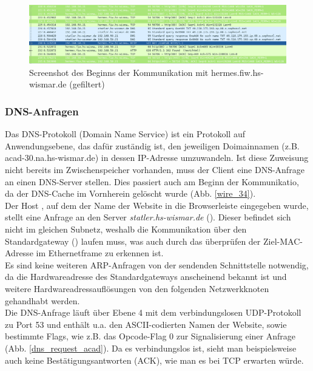 \documentclass[11pt, a4paper]{article}
\begin{document}
\begin{figure}[H]
  \centering
  \includegraphics[width=\textwidth]{graphics/versuch/3_4/wireshark/wire_34_hermes}
  \caption{Screenshot des Beginns der Kommunikation mit hermes.fiw.hs-wismar.de (gefiltert)}\label{wire_34_hermes}
\end{figure}

\subsubsection{DNS-Anfragen}
Das DNS-Protokoll (Domain Name Service) ist ein Protokoll auf Anwendungsebene, das dafür zuständig ist, den jeweiligen Doimainnamen (z.B. acad-30.na.hs-wismar.de) in dessen IP-Adresse umzuwandeln. Ist diese Zuweisung nicht bereits im Zwischenspeicher vorhanden, muss der Client eine DNS-Anfrage an einen DNS-Server stellen. Dies passiert auch am Beginn der Kommunikatio, da der DNS-Cache im Vornherein gelöscht wurde (Abb. \ref{wire_34}).\\

Der Host , auf dem der Name der Website in die Browserleiste eingegeben wurde, stellt eine Anfrage an den Server \emph{statler.hs-wismar.de} (). Dieser befindet sich nicht im gleichen Subnetz, weshalb die Kommunikation über den Standardgateway () laufen muss, was auch durch das überprüfen der Ziel-MAC-Adresse im Ethernetframe zu erkennen ist.\\

Es sind keine weiteren ARP-Anfragen von der sendenden Schnittstelle notwendig, da die Hardwareadresse des Standardgateways anscheinend bekannt ist und weitere Hardwareadressauflösungen von den folgenden Netzwerkknoten gehandhabt werden.\\

Die DNS-Anfrage läuft über Ebene 4 mit dem verbindungslosen UDP-Protokoll zu Port 53 und enthält u.a. den ASCII-codierten Namen der Website, sowie bestimmte Flags, wie z.B. das Opcode-Flag 0 zur Signalisierung einer Anfrage (Abb. \ref{dns_request_acad}). Da es verbindungslos ist, sieht man beispielsweise auch keine Bestätigungsantworten (ACK), wie man es bei TCP erwarten würde.\\
\end{document}
